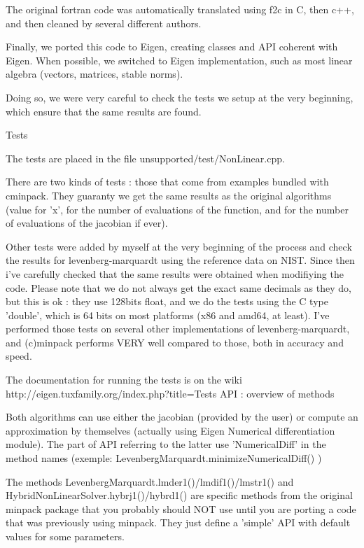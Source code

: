 The original fortran code was automatically translated using f2c in C, then c++, and then cleaned by several different authors. 

Finally, we ported this code to Eigen, creating classes and API coherent with Eigen. When possible, we switched to Eigen implementation, such as most linear algebra (vectors, matrices, stable norms).

Doing so, we were very careful to check the tests we setup at the very beginning, which ensure that the same results are found.


Tests

The tests are placed in the file unsupported/test/NonLinear.cpp.

There are two kinds of tests : those that come from examples bundled with cminpack. They guaranty we get the same results as the original algorithms (value for 'x', for the number of evaluations of the function, and for the number of evaluations of the jacobian if ever).

Other tests were added by myself at the very beginning of the process and check the results for levenberg-marquardt using the reference data on NIST. Since then i've carefully checked that the same results were obtained when modifiying the code. Please note that we do not always get the exact same decimals as they do, but this is ok : they use 128bits float, and we do the tests using the C type 'double', which is 64 bits on most platforms (x86 and amd64, at least). I've performed those tests on several other implementations of levenberg-marquardt, and (c)minpack performs VERY well compared to those, both in accuracy and speed.

The documentation for running the tests is on the wiki http://eigen.tuxfamily.org/index.php?title=Tests
API : overview of methods

Both algorithms can use either the jacobian (provided by the user) or compute an approximation by themselves (actually using Eigen Numerical differentiation module). The part of API referring to the latter use 'NumericalDiff' in the method names (exemple: LevenbergMarquardt.minimizeNumericalDiff() )

The methods LevenbergMarquardt.lmder1()/lmdif1()/lmstr1() and HybridNonLinearSolver.hybrj1()/hybrd1() are specific methods from the original minpack package that you probably should NOT use until you are porting a code that was previously using minpack. They just define a 'simple' API with default values for some parameters.

